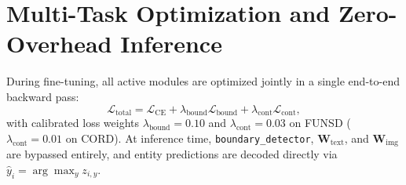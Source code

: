 \section{Multi-Task Optimization and Zero-Overhead Inference}
\label{sec:joint_objective}

During fine-tuning, all active modules are optimized jointly in a single end-to-end backward pass:
\begin{equation}
    \mathcal{L}_{\text{total}} = \mathcal{L}_{\text{CE}} + \lambda_{\text{bound}} \mathcal{L}_{\text{bound}} + \lambda_{\text{cont}} \mathcal{L}_{\text{cont}},
    \label{eq:total_loss}
\end{equation}
with calibrated loss weights $\lambda_{\text{bound}} = 0.10$ and $\lambda_{\text{cont}} = 0.03$ on FUNSD ($\lambda_{\text{cont}} = 0.01$ on CORD). At inference time, \texttt{boundary\_detector}, $\mathbf{W}_{\text{text}}$, and $\mathbf{W}_{\text{img}}$ are bypassed entirely, and entity predictions are decoded directly via $\hat{y}_i = \arg\max_y z_{i,y}$.
